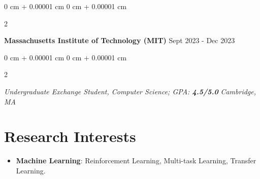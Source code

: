 \documentclass[10pt, letterpaper]{article}
\newenvironment{highlights}{
    \begin{itemize}[
        topsep=0.10 cm,
        parsep=0.10 cm,
        partopsep=0pt,
        itemsep=0pt,
        leftmargin=0 cm + 10pt
    ]
}{
    \end{itemize}
} %
\newenvironment{onecolentry}{
    \begin{adjustwidth}{
        0 cm + 0.00001 cm
    }{
        0 cm + 0.00001 cm
    }
}{
    \end{adjustwidth}
} %
\newenvironment{twocolentry}[2][]{
    \onecolentry
    \def\secondColumn{#2}
    \setcolumnwidth{\fill, 4.5 cm}
    \begin{paracol}{2}
}{
    \switchcolumn \raggedleft \secondColumn
    \end{paracol}
    \endonecolentry
} %
\begin{document}
        \vspace{0.10 cm}
        \begin{twocolentry}{
            Sept 2023 - Dec 2023
        }
            \textbf{Massachusetts Institute of Technology (MIT)}\end{twocolentry}
        \begin{twocolentry}{
            \textit{Cambridge, MA}
        }
            \textit{Undergraduate Exchange Student, Computer Science; GPA: \textbf{4.5/5.0}}\end{twocolentry}
        \vspace{0.10 cm}
    \section{Research Interests}
        \begin{highlights}
            \item \textbf{Machine Learning}: Reinforcement Learning, Multi-task Learning, Transfer Learning.
        \end{highlights}
\end{document}
